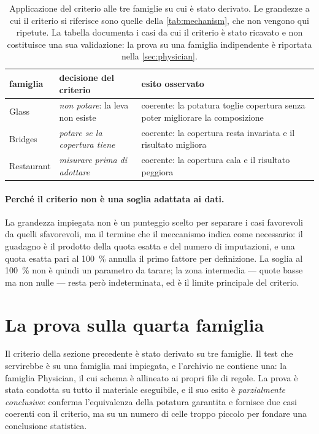 \begin{table}[htbp]
\centering
\caption{Applicazione del criterio alle tre famiglie su cui è stato derivato. Le grandezze a
cui il criterio si riferisce sono quelle della \autoref{tab:mechanism}, che non vengono qui
ripetute. La tabella documenta i casi da cui il criterio è stato ricavato e non costituisce una
sua validazione: la prova su una famiglia indipendente è riportata nella
\autoref{sec:physician}.}
\label{tab:criterion}
\footnotesize
\begin{tabular}{@{}lp{4.5cm}p{5.4cm}@{}}
\toprule
famiglia & decisione del criterio & esito osservato \\
\midrule
Glass & \emph{non potare}: la leva non esiste & coerente: la potatura toglie copertura senza poter migliorare la composizione \\
Bridges & \emph{potare se la copertura tiene} & coerente: la copertura resta invariata e il risultato migliora \\
Restaurant & \emph{misurare prima di adottare} & coerente: la copertura cala e il risultato peggiora \\
\bottomrule
\end{tabular}
\end{table}

\paragraph{Perché il criterio non è una soglia adattata ai dati.} La grandezza impiegata non è un
punteggio scelto per separare i casi favorevoli da quelli sfavorevoli, ma il termine che il
meccanismo indica come necessario: il guadagno è il prodotto della quota esatta e del numero di
imputazioni, e una quota esatta pari al \SI{100}{\percent} annulla il primo fattore per
definizione. La soglia al \SI{100}{\percent} non è quindi un parametro da tarare; la zona
intermedia --- quote basse ma non nulle --- resta però indeterminata, ed è il limite principale
del criterio.

\section{La prova sulla quarta famiglia}\label{sec:physician}

Il criterio della sezione precedente è stato derivato su tre famiglie. Il test che servirebbe è su
una famiglia mai impiegata, e l'archivio ne contiene una: la famiglia Physician, il cui schema è
allineato ai propri file di regole. La prova è stata condotta su tutto il materiale eseguibile, e
il suo esito è \emph{parzialmente conclusivo}: conferma l'equivalenza della potatura garantita e
fornisce due casi coerenti con il criterio, ma su un numero di celle troppo piccolo per fondare
una conclusione statistica.

